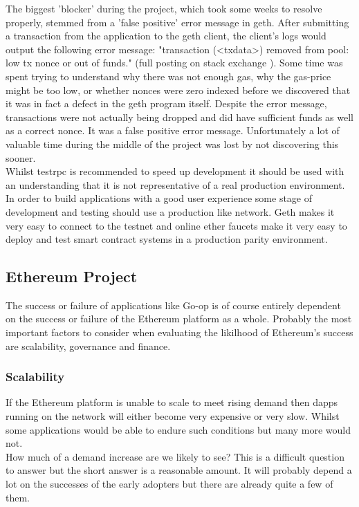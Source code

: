The biggest 'blocker' during the project, which took some weeks to resolve properly, stemmed from a 'false positive' error message in geth. After submitting a transaction from the application to the geth client, the client's logs would output the following error message: "transaction (<txdata>) removed from pool: low tx nonce or out of funds." (full posting on stack exchange \cite{GethStackExchange}). Some time was spent trying to understand why there was not enough gas, why the gas-price might be too low, or whether nonces were zero indexed before we discovered that it was in fact a defect in the geth program itself\cite{GethBug}. Despite the error message, transactions were not actually being dropped and did have sufficient funds as well as a correct nonce. It was a false positive error message. Unfortunately a lot of valuable time during the middle of the project was lost by not discovering this sooner. \\

Whilst testrpc is recommended to speed up development it should be used with an understanding that it is not representative of a real production environment. In order to build applications with a good user experience some stage of development and testing should use a production like network. Geth makes it very easy to connect to the testnet and online ether faucets make it very easy to deploy and test smart contract systems in a production parity environment. \\

\subsection{Ethereum Project}
The success or failure of applications like Go-op is of course entirely dependent on the success or failure of the Ethereum platform as a whole. Probably the most important factors to consider when evaluating the likilhood of Ethereum's success are scalability, governance and finance.

\subsubsection{Scalability}
If the Ethereum platform is unable to scale to meet rising demand then dapps running on the network will either become very expensive or very slow. Whilst some applications would be able to endure such conditions but many more would not. \\

How much of a demand increase are we likely to see? This is a difficult question to answer but the short answer is a reasonable amount. It will probably depend a lot on the successes of the early adopters but there are already quite a few of them.\\

